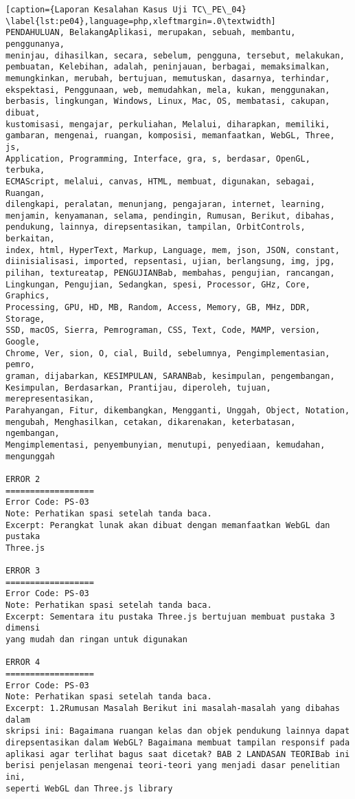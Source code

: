 \begin{enumerate}
\begin{lstlisting}[caption={Laporan Kesalahan Kasus Uji TC\_PE\_04}	\label{lst:pe04},language=php,xleftmargin=.0\textwidth]
PENDAHULUAN, BelakangAplikasi, merupakan, sebuah, membantu, penggunanya, 
meninjau, dihasilkan, secara, sebelum, pengguna, tersebut, melakukan, 
pembuatan, Kelebihan, adalah, peninjauan, berbagai, memaksimalkan, 
memungkinkan, merubah, bertujuan, memutuskan, dasarnya, terhindar, 
ekspektasi, Penggunaan, web, memudahkan, mela, kukan, menggunakan, 
berbasis, lingkungan, Windows, Linux, Mac, OS, membatasi, cakupan, dibuat, 
kustomisasi, mengajar, perkuliahan, Melalui, diharapkan, memiliki, 
gambaran, mengenai, ruangan, komposisi, memanfaatkan, WebGL, Three, js, 
Application, Programming, Interface, gra, s, berdasar, OpenGL, terbuka, 
ECMAScript, melalui, canvas, HTML, membuat, digunakan, sebagai, Ruangan, 
dilengkapi, peralatan, menunjang, pengajaran, internet, learning, 
menjamin, kenyamanan, selama, pendingin, Rumusan, Berikut, dibahas, 
pendukung, lainnya, direpsentasikan, tampilan, OrbitControls, berkaitan, 
index, html, HyperText, Markup, Language, mem, json, JSON, constant, 
diinisialisasi, imported, repsentasi, ujian, berlangsung, img, jpg, 
pilihan, textureatap, PENGUJIANBab, membahas, pengujian, rancangan, 
Lingkungan, Pengujian, Sedangkan, spesi, Processor, GHz, Core, Graphics, 
Processing, GPU, HD, MB, Random, Access, Memory, GB, MHz, DDR, Storage, 
SSD, macOS, Sierra, Pemrograman, CSS, Text, Code, MAMP, version, Google, 
Chrome, Ver, sion, O, cial, Build, sebelumnya, Pengimplementasian, pemro, 
graman, dijabarkan, KESIMPULAN, SARANBab, kesimpulan, pengembangan, 
Kesimpulan, Berdasarkan, Prantijau, diperoleh, tujuan, merepresentasikan, 
Parahyangan, Fitur, dikembangkan, Mengganti, Unggah, Object, Notation, 
mengubah, Menghasilkan, cetakan, dikarenakan, keterbatasan, ngembangan, 
Mengimplementasi, penyembunyian, menutupi, penyediaan, kemudahan, 
mengunggah

ERROR 2
==================
Error Code: PS-03
Note: Perhatikan spasi setelah tanda baca.
Excerpt: Perangkat lunak akan dibuat dengan memanfaatkan WebGL dan pustaka 
Three.js

ERROR 3
==================
Error Code: PS-03
Note: Perhatikan spasi setelah tanda baca.
Excerpt: Sementara itu pustaka Three.js bertujuan membuat pustaka 3 dimensi 
yang mudah dan ringan untuk digunakan

ERROR 4
==================
Error Code: PS-03
Note: Perhatikan spasi setelah tanda baca.
Excerpt: 1.2Rumusan Masalah Berikut ini masalah-masalah yang dibahas dalam 
skripsi ini: Bagaimana ruangan kelas dan objek pendukung lainnya dapat 
direpsentasikan dalam WebGL? Bagaimana membuat tampilan responsif pada 
aplikasi agar terlihat bagus saat dicetak? BAB 2 LANDASAN TEORIBab ini 
berisi penjelasan mengenai teori-teori yang menjadi dasar penelitian ini, 
seperti WebGL dan Three.js library


\end{lstlisting}
\end{enumerate}
